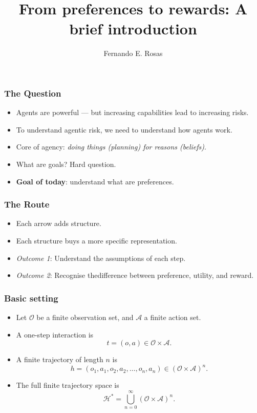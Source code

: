 \documentclass[10pt,a4paper]{beamer}
\title[From preferences to rewards]
{From preferences to rewards: A brief introduction}
\author[F. Rosas]
{Fernando E. Rosas}
\institute[Iliad]
{
  Iliad Intensive
}
\newcommand{\Hcal}{\mathcal{H}}
\newcommand{\Ofin}{\mathcal{O}}
\newcommand{\Afin}{\mathcal{A}}
\begin{document}
\frame{\titlepage}

\begin{frame}
\frametitle{The Question}
\begin{itemize}
    \item Agents are powerful --- but increasing capabilities lead to increasing risks.
    \pause
    \item To understand agentic risk, we need to understand how agents work.
    \pause
    \item Core of agency: \textit{doing things (planning) for reasons (beliefs)}.
    \pause
    \item What are goals? Hard question.
    \pause
    \item \textbf{Goal of today}: understand what are preferences.
\end{itemize}
\end{frame}

\begin{frame}
\frametitle{The Route}
\centering
{}

\vspace{0.65cm}
\begin{itemize}
    \item Each arrow adds structure.
    \pause
    \item Each structure buys a more specific representation.
    \pause
    \item \textit{Outcome 1}: Understand the assumptions of each step.
    \pause
    \item \textit{Outcome 2}: Recognise thedifference between preference, utility, and reward.
\end{itemize}
\end{frame}

\begin{frame}
\frametitle{Basic setting}
\begin{itemize}
    \item Let $\Ofin$ be a finite observation set, and $\Afin$ a finite action set.
    \pause
    \item A one-step interaction is
    $$
    t=(o,a)\in \Ofin\times \Afin.
    $$
    \pause
    \item A finite trajectory of length $n$ is
    $$
    h=(o_1,a_1,o_2,a_2,\dots,o_n,a_n)\in(\Ofin\times\Afin)^n.
    $$
    \pause
    \item The full finite trajectory space is
    $$
    \Hcal^*=\bigcup_{n=0}^{\infty}(\Ofin\times\Afin)^n.
    $$
\end{itemize}
\end{frame}
\end{document}
